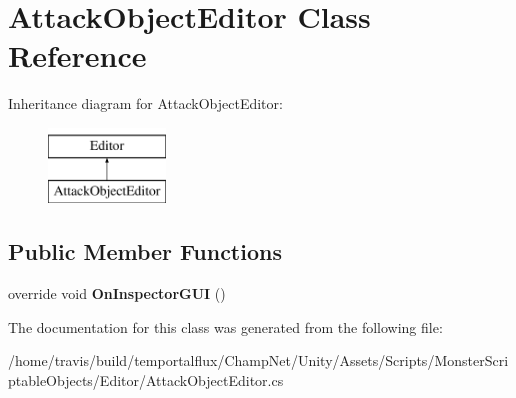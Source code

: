 \hypertarget{class_attack_object_editor}{\section{Attack\-Object\-Editor Class Reference}
\label{class_attack_object_editor}
}
Inheritance diagram for Attack\-Object\-Editor\-:\begin{figure}[H]
\begin{center}
\leavevmode
\includegraphics[height=2.000000cm]{class_attack_object_editor}
\end{center}
\end{figure}
\subsection*{Public Member Functions}
\begin{DoxyCompactItemize}
\item 
\hypertarget{class_attack_object_editor_ad41f5d42552191e05f82ba2f83afc673}{override void {\bfseries On\-Inspector\-G\-U\-I} ()}\label{class_attack_object_editor_ad41f5d42552191e05f82ba2f83afc673}

\end{DoxyCompactItemize}


The documentation for this class was generated from the following file\-:\begin{DoxyCompactItemize}
\item 
/home/travis/build/temportalflux/\-Champ\-Net/\-Unity/\-Assets/\-Scripts/\-Monster\-Scriptable\-Objects/\-Editor/Attack\-Object\-Editor.\-cs\end{DoxyCompactItemize}
